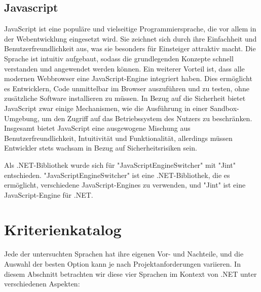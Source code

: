\cite{csharpScriptingArcticel}

\newpage 
\subsection{Javascript}
JavaScript ist eine populäre und vielseitige Programmiersprache, die vor allem in der Webentwicklung eingesetzt wird. 
Sie zeichnet sich durch ihre Einfachheit und Benutzerfreundlichkeit aus, was sie besonders für Einsteiger attraktiv macht. 
Die Sprache ist intuitiv aufgebaut, sodass die grundlegenden Konzepte schnell verstanden und angewendet werden können. 
Ein weiterer Vorteil ist, dass alle modernen Webbrowser eine JavaScript-Engine integriert haben. 
Dies ermöglicht es Entwicklern, Code unmittelbar im Browser auszuführen und zu testen, ohne zusätzliche Software installieren zu müssen. 
In Bezug auf die Sicherheit bietet JavaScript zwar einige Mechanismen, wie die Ausführung in einer Sandbox-Umgebung, um den Zugriff auf das Betriebssystem des Nutzers zu beschränken.  
Insgesamt bietet JavaScript eine ausgewogene Mischung aus Benutzerfreundlichkeit, Intuitivität und Funktionalität, allerdings müssen Entwickler stets wachsam in Bezug auf Sicherheitsrisiken sein.

Als .NET-Bibliothek wurde sich für "JavaScriptEngineSwitcher" mit "Jint" entschieden.
"JavaScriptEngineSwitcher" ist eine .NET-Bibliothek, die es ermöglicht, verschiedene JavaScript-Engines zu verwenden, und "Jint" ist eine JavaScript-Engine für .NET.


\cite{mDNWebDocs} \cite{owasp}

\newpage
\section{Kriterienkatalog}
Jede der untersuchten Sprachen hat ihre eigenen Vor- und Nachteile, und die Auswahl der besten Option kann je nach Projektanforderungen variieren. 
In diesem Abschnitt betrachten wir diese vier Sprachen im Kontext von .NET unter verschiedenen Aspekten:

